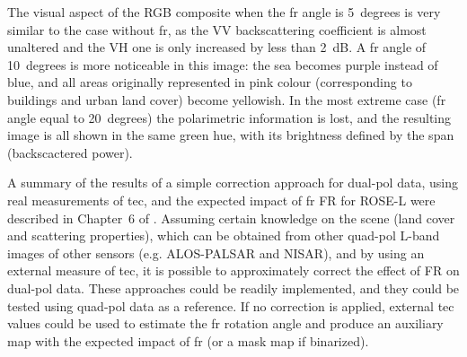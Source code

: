The visual aspect of the RGB composite when the \acs{fr} angle  is 5~degrees is very similar to the case without \acs{fr}, as the VV backscattering coefficient is almost unaltered and the VH one is only increased by less than 2~dB. A \acs{fr} angle of 10~degrees is more noticeable in this image: the sea becomes purple instead of blue, and all areas originally represented in pink colour (corresponding to buildings and urban land cover) become yellowish. In the most extreme case (\acs{fr} angle equal to 20~degrees) the polarimetric information is lost, and the resulting image is all shown in the same green hue, with its brightness defined by the span (backscactered power).

A summary of the results of a simple correction approach for dual-pol data, using real measurements of \acs{tec}, and the expected impact of \acs{fr} FR for ROSE-L were described in Chapter~6 of \citep{Hajnsek2019}.
Assuming certain knowledge on the scene (land cover and scattering properties), which can be obtained from other quad-pol L-band images of other sensors (e.g. ALOS-PALSAR and NISAR), and by using an external measure of \acs{tec}, it is possible to approximately correct the effect of FR on dual-pol data. These approaches  could be readily implemented, and they could be tested using quad-pol data as a reference. If no correction is applied, external \acs{tec} values could be used to estimate the \acs{fr} rotation angle and produce an auxiliary map with the expected impact of \acs{fr} (or a mask map if binarized). 
